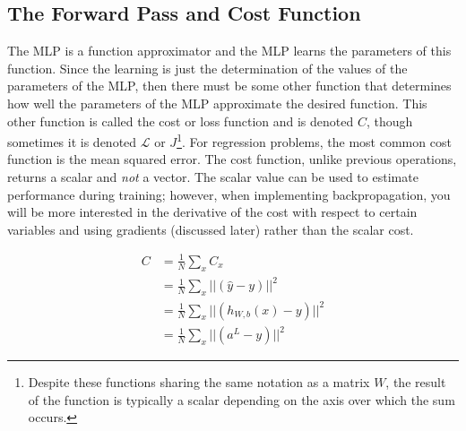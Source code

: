 \documentclass{article}
\begin{document}

\subsection{The Forward Pass and Cost Function}

The MLP is a function approximator and the MLP learns the parameters of
this function. Since the learning is just the determination of the values of the
parameters of the MLP, then there must be some other function that determines
how well the parameters of the MLP approximate the desired function. This other
function is called the cost or loss function and is denoted $C$, though sometimes
it is denoted $\mathcal{L}$ or $J$\footnote{Despite these functions sharing the same notation as
	a matrix $W$, the result of the function is typically a scalar
	depending on the axis over which the sum occurs.}.
For regression problems, the most common
cost function is the mean squared error. The cost function, unlike previous
operations, returns a scalar and \textit{not} a vector. The scalar value can be used to estimate
performance during training; however, when implementing backpropagation, you will
be more interested in the derivative of the cost with respect to certain variables
and using gradients (discussed later) rather than the scalar cost.

\begin{equation}
	\begin{aligned}
		C & = \frac{1}{N} \sum_{x} {C_x}                       \\
		  & = \frac{1}{N} \sum_{x} {||(\hat{y} - y)||^{2} }    \\
		  & = \frac{1}{N} \sum_{x} {||(h_{W,b}(x) - y)||^{2} } \\
		  & = \frac{1}{N} \sum_{x} {||(a^{L} - y)||^{2} }
	\end{aligned}
\end{equation}
\end{document}
